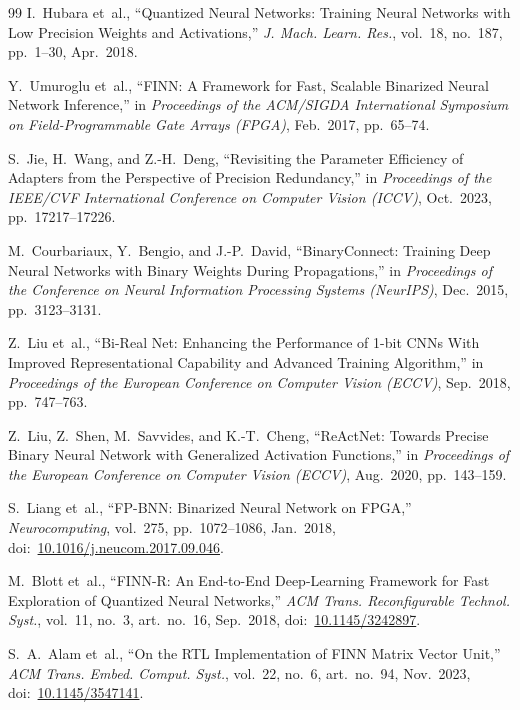 \documentclass[conference]{IEEEtran}
\begin{document}
\begin{thebibliography}{99}
I.~Hubara et~al.,
``Quantized Neural Networks: Training Neural Networks with Low Precision Weights and Activations,''
\emph{J. Mach. Learn. Res.}, vol.~18, no.~187, pp.~1--30, Apr.~2018.

Y.~Umuroglu et~al.,
``FINN: A Framework for Fast, Scalable Binarized Neural Network Inference,''
in \emph{Proceedings of the ACM/SIGDA International Symposium on Field-Programmable Gate Arrays (FPGA)}, Feb.~2017, pp.~65--74.


S.~Jie, H.~Wang, and Z.-H.~Deng,
``Revisiting the Parameter Efficiency of Adapters from the Perspective of Precision Redundancy,''
in \emph{Proceedings of the IEEE/CVF International Conference on Computer Vision (ICCV)}, Oct.~2023, pp.~17217--17226.

M.~Courbariaux, Y.~Bengio, and J.-P.~David,
``BinaryConnect: Training Deep Neural Networks with Binary Weights During Propagations,''
in \emph{Proceedings of the Conference on Neural Information Processing Systems (NeurIPS)}, Dec.~2015, pp.~3123--3131.

Z.~Liu et~al.,
``Bi-Real Net: Enhancing the Performance of 1-bit CNNs With Improved Representational Capability and Advanced Training Algorithm,''
in \emph{Proceedings of the European Conference on Computer Vision (ECCV)}, Sep.~2018, pp.~747--763.

Z.~Liu, Z.~Shen, M.~Savvides, and K.-T.~Cheng,
``ReActNet: Towards Precise Binary Neural Network with Generalized Activation Functions,''
in \emph{Proceedings of the European Conference on Computer Vision (ECCV)}, Aug.~2020, pp.~143--159.

S.~Liang et~al.,
``FP-BNN: Binarized Neural Network on FPGA,''
\emph{Neurocomputing}, vol.~275, pp.~1072--1086, Jan.~2018,
doi:~\url{10.1016/j.neucom.2017.09.046}.

M.~Blott et~al.,
``FINN-R: An End-to-End Deep-Learning Framework for Fast Exploration of Quantized Neural Networks,''
\emph{ACM Trans. Reconfigurable Technol. Syst.}, vol.~11, no.~3, art.~no.~16, Sep.~2018,
doi:~\url{10.1145/3242897}.

S.~A.~Alam et~al.,
``On the RTL Implementation of FINN Matrix Vector Unit,''
\emph{ACM Trans. Embed. Comput. Syst.}, vol.~22, no.~6, art.~no.~94, Nov.~2023,
doi:~\url{10.1145/3547141}.


\end{thebibliography}
\end{document}
